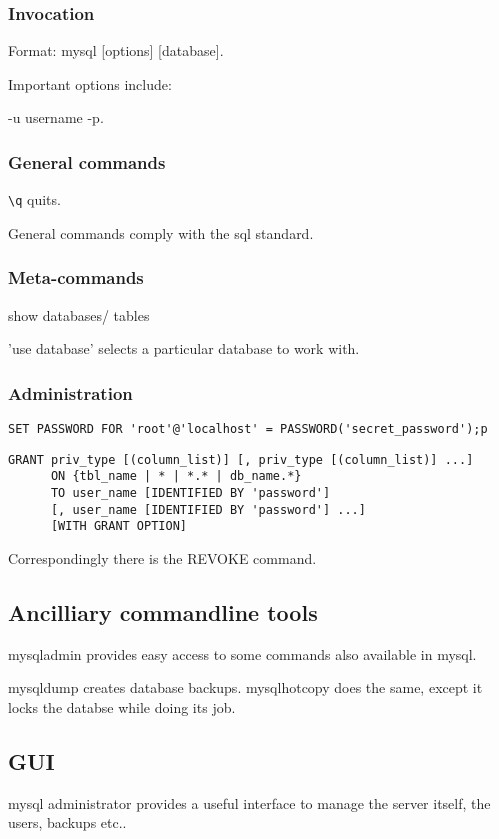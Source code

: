 \documentclass[oneside, article]{memoir}
\begin{document}
\subsubsection{Invocation}
Format: mysql [options] [database].

Important options include:

-u username -p.

\subsubsection{General commands}
\verb'\q' quits.

General commands comply with the sql standard.

\subsubsection{Meta-commands}
show databases/ tables

'use database' selects a particular database to work with.

\subsubsection{Administration}
\verb[SET PASSWORD FOR 'root'@'localhost' = PASSWORD('secret_password');p[

\begin{verbatim}
GRANT priv_type [(column_list)] [, priv_type [(column_list)] ...]
      ON {tbl_name | * | *.* | db_name.*}
      TO user_name [IDENTIFIED BY 'password']
      [, user_name [IDENTIFIED BY 'password'] ...]
      [WITH GRANT OPTION]
\end{verbatim}

Correspondingly there is the REVOKE command.

\subsection{Ancilliary commandline tools}
mysqladmin provides easy access to some commands also available in mysql.

mysqldump creates database backups. mysqlhotcopy does the same, except it locks the databse while doing its job.

\tbc

\subsection{GUI}
mysql administrator provides a useful interface to manage the server itself, the users, backups etc..
\end{document}
